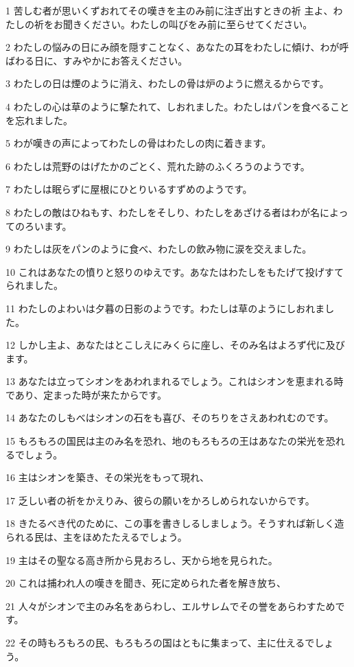 \par 1 苦しむ者が思いくずおれてその嘆きを主のみ前に注ぎ出すときの祈 主よ、わたしの祈をお聞きください。わたしの叫びをみ前に至らせてください。
\par 2 わたしの悩みの日にみ顔を隠すことなく、あなたの耳をわたしに傾け、わが呼ばわる日に、すみやかにお答えください。
\par 3 わたしの日は煙のように消え、わたしの骨は炉のように燃えるからです。
\par 4 わたしの心は草のように撃たれて、しおれました。わたしはパンを食べることを忘れました。
\par 5 わが嘆きの声によってわたしの骨はわたしの肉に着きます。
\par 6 わたしは荒野のはげたかのごとく、荒れた跡のふくろうのようです。
\par 7 わたしは眠らずに屋根にひとりいるすずめのようです。
\par 8 わたしの敵はひねもす、わたしをそしり、わたしをあざける者はわが名によってのろいます。
\par 9 わたしは灰をパンのように食べ、わたしの飲み物に涙を交えました。
\par 10 これはあなたの憤りと怒りのゆえです。あなたはわたしをもたげて投げすてられました。
\par 11 わたしのよわいは夕暮の日影のようです。わたしは草のようにしおれました。
\par 12 しかし主よ、あなたはとこしえにみくらに座し、そのみ名はよろず代に及びます。
\par 13 あなたは立ってシオンをあわれまれるでしょう。これはシオンを恵まれる時であり、定まった時が来たからです。
\par 14 あなたのしもべはシオンの石をも喜び、そのちりをさえあわれむのです。
\par 15 もろもろの国民は主のみ名を恐れ、地のもろもろの王はあなたの栄光を恐れるでしょう。
\par 16 主はシオンを築き、その栄光をもって現れ、
\par 17 乏しい者の祈をかえりみ、彼らの願いをかろしめられないからです。
\par 18 きたるべき代のために、この事を書きしるしましょう。そうすれば新しく造られる民は、主をほめたたえるでしょう。
\par 19 主はその聖なる高き所から見おろし、天から地を見られた。
\par 20 これは捕われ人の嘆きを聞き、死に定められた者を解き放ち、
\par 21 人々がシオンで主のみ名をあらわし、エルサレムでその誉をあらわすためです。
\par 22 その時もろもろの民、もろもろの国はともに集まって、主に仕えるでしょう。

